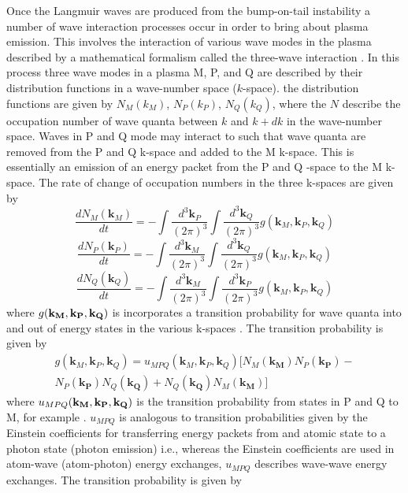 Once the Langmuir waves are produced from the bump-on-tail instability a number of wave interaction processes occur in order to bring about plasma emission. This involves the interaction of various wave modes in the plasma described by a mathematical formalism called the three-wave interaction \citep{robinson1993, robinson1994}. In this process three wave modes in a plasma M, P, and Q are described by their distribution functions in a wave-number space ($k$-space). the distribution functions are given by $N_M(k_M)$, $N_P(k_P)$, $N_Q(k_Q)$, where the $N$ describe the occupation number of wave quanta between $k$ and $k+dk$ in the wave-number space. Waves in P and Q mode may interact to such that wave quanta are removed from the P and Q k-space and added to the M k-space. This is essentially an emission of an energy packet from the P and Q -space to the M k-space. The rate of change of occupation numbers in the three k-spaces are given by
\begin{equation}
\frac{dN_M(\mathbf{k}_M)}{dt} = -\int \frac{d^3\mathbf{k}_P}{(2\pi)^3}\int \frac{d^3\mathbf{k}_Q}{(2\pi)^3}g(\mathbf{k}_M, \mathbf{k}_P, \mathbf{k}_Q)
\end{equation}
\begin{equation}
\frac{dN_P(\mathbf{k}_P)}{dt} = -\int \frac{d^3\mathbf{k}_M}{(2\pi)^3}\int \frac{d^3\mathbf{k}_Q}{(2\pi)^3}g(\mathbf{k}_M, \mathbf{k}_P, \mathbf{k}_Q)
\end{equation}
\begin{equation}
\frac{dN_Q(\mathbf{k}_Q)}{dt} = -\int \frac{d^3\mathbf{k}_M}{(2\pi)^3}\int \frac{d^3\mathbf{k}_P}{(2\pi)^3}g(\mathbf{k}_M, \mathbf{k}_P, \mathbf{k}_Q)
\end{equation}
where $g(\bf{k}_M, \bf{k}_P, \bf{k}_Q)$ is incorporates a transition probability for wave quanta into and out of energy states in the various k-spaces \citep{robinson1994}. The transition probability is given by
\begin{multline}
g(\mathbf{k}_M, \mathbf{k}_P, \mathbf{k}_Q) = u_{MPQ}(\mathbf{k}_M, \mathbf{k}_P, \mathbf{k}_Q)   [N_M(\mathbf{k_M}) N_P(\mathbf{k_P})  - \\ 
N_P(\mathbf{k_P}) N_Q(\mathbf{k_Q})   +N_Q(\mathbf{k_Q}) N_M(\mathbf{k_M})  ]
\end{multline}
where $u_{MPQ}(\bf{k}_M, \bf{k}_P, \bf{k}_Q) $ is the transition probability from states in P and Q  to M, for example \citep{melrose1986}. $u_{MPQ}$ is analogous to transition probabilities given by the Einstein coefficients for transferring energy packets from and atomic state to a photon state (photon emission) i.e., whereas the Einstein coefficients are used in atom-wave (atom-photon) energy exchanges, $u_{MPQ}$ describes wave-wave energy exchanges. The transition probability is given by
